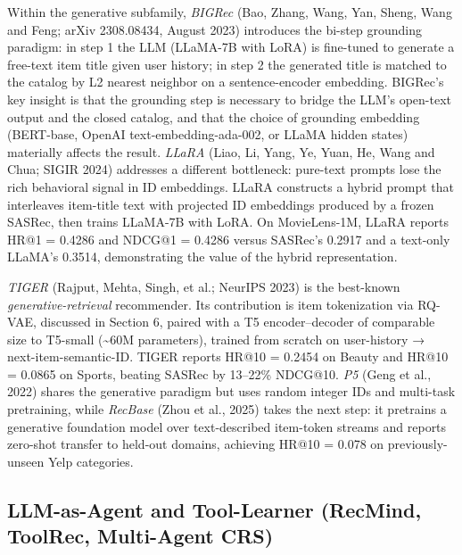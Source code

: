 Within the generative subfamily, \emph{BIGRec} (Bao, Zhang, Wang, Yan, Sheng, Wang and Feng; arXiv 2308.08434, August 2023) introduces the bi-step grounding paradigm: in step 1 the LLM (LLaMA-7B with LoRA) is fine-tuned to generate a free-text item title given user history; in step 2 the generated title is matched to the catalog by L2 nearest neighbor on a sentence-encoder embedding. BIGRec's key insight is that the grounding step is necessary to bridge the LLM's open-text output and the closed catalog, and that the choice of grounding embedding (BERT-base, OpenAI text-embedding-ada-002, or LLaMA hidden states) materially affects the result. \emph{LLaRA} (Liao, Li, Yang, Ye, Yuan, He, Wang and Chua; SIGIR 2024) addresses a different bottleneck: pure-text prompts lose the rich behavioral signal in ID embeddings. LLaRA constructs a hybrid prompt that interleaves item-title text with projected ID embeddings produced by a frozen SASRec, then trains LLaMA-7B with LoRA. On MovieLens-1M, LLaRA reports HR@1 = 0.4286 and NDCG@1 = 0.4286 versus SASRec's 0.2917 and a text-only LLaMA's 0.3514, demonstrating the value of the hybrid representation.

\emph{TIGER} (Rajput, Mehta, Singh, et al.; NeurIPS 2023) is the best-known \emph{generative-retrieval} recommender. Its contribution is item tokenization via RQ-VAE, discussed in Section 6, paired with a T5 encoder--decoder of comparable size to T5-small (\textasciitilde60M parameters), trained from scratch on user-history → next-item-semantic-ID. TIGER reports HR@10 = 0.2454 on Beauty and HR@10 = 0.0865 on Sports, beating SASRec by 13--22\% NDCG@10. \emph{P5} (Geng et al., 2022) shares the generative paradigm but uses random integer IDs and multi-task pretraining, while \emph{RecBase} (Zhou et al., 2025) takes the next step: it pretrains a generative foundation model over text-described item-token streams and reports zero-shot transfer to held-out domains, achieving HR@10 = 0.078 on previously-unseen Yelp categories.

\subsection{LLM-as-Agent and Tool-Learner (RecMind, ToolRec, Multi-Agent CRS)}\label{llm-as-agent-and-tool-learner-recmind-toolrec-multi-agent-crs}

